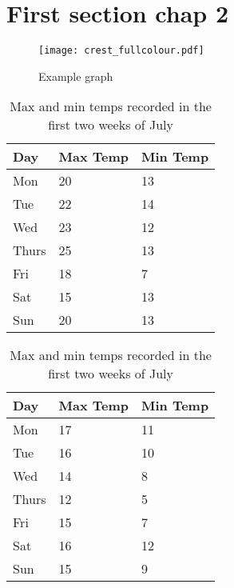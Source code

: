 \section{First section chap 2} \label{sect_21}
\lipsum[1]
\begin{figure}[h]
  \centering
  \texttt{[image: crest\_fullcolour.pdf]}
  \caption{Example graph}
  \label{plot_example_graph}
\end{figure}
\lipsum[1]
\begin{table}[h]
  \begin{subtable}[h]{0.45\textwidth}
    \centering
    \begin{tabular}{l | l | l}
      Day & Max Temp & Min Temp \\
      \hline \hline
      Mon & 20 & 13\\
      Tue & 22 & 14\\
      Wed & 23 & 12\\
      Thurs & 25 & 13\\
      Fri & 18 & 7\\
      Sat & 15 & 13\\
      Sun & 20 & 13
    \end{tabular}
    \caption{First Week}
    \label{tab:week1}
  \end{subtable}
  \hfill
  \begin{subtable}[h]{0.45\textwidth}
    \centering
    \begin{tabular}{l | l | l}
      Day & Max Temp & Min Temp \\
      \hline \hline
      Mon & 17 & 11\\
      Tue & 16 & 10\\
      Wed & 14 & 8\\
      Thurs & 12 & 5\\
      Fri & 15 & 7\\
      Sat & 16 & 12\\
      Sun & 15 & 9
    \end{tabular}
    \caption{Second Week}
    \label{tab:week2}
  \end{subtable}
  \caption{Max and min temps recorded in the first two weeks of July}
  \label{tab:temps}
\end{table}
